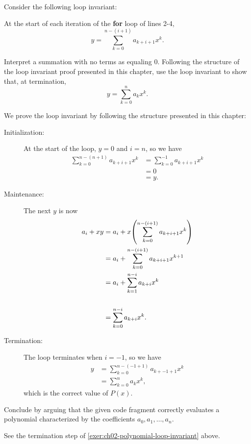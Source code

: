 \documentclass[Chapter02]{subfiles}
\begin{document}
\begin{problems}
\begin{problems}
			\item Consider the following loop invariant: \label{exer:ch02-polynomial-loop-invariant}
			\begin{addmargin}[2em]{2em}
				At the start of each iteration of the \textbf{for} loop of lines 2-4,
				\[
					y = \sum_{k = 0}^{n - (i + 1)} a_{k + i + 1}x^k.
				\]
			\end{addmargin}
			Interpret a summation with no terms as equaling 0. Following the structure of the loop invariant proof presented in this chapter, use the loop invariant to show that, at termination,
			\[
				y = \sum_{k = 0}^n a_kx^k.
			\]
			\begin{answer}
				We prove the loop invariant by following the structure presented in this chapter:
				\begin{description}
					\item[Initialization:] At the start of the loop, $y = 0$ and $i = n$, so we have
					\begin{align*}
						\sum_{k = 0}^{n - (n + 1)} a_{k + i + 1} x^k &= \sum_{k = 0}^{-1} a_{k + i + 1} x^k\\
							&= 0\\
							&= y.
					\end{align*}

					\item[Maintenance:] The next $y$ is now
					\begin{align*}
						a_i + xy &= a_i + x\qty(\sum_{k = 0}^{n - (i + 1)} a_{k + i + 1}x^k)\\
							&= a_i + \sum_{k = 0}^{n - (i + 1)} a_{k + i + 1}x^{k + 1}\\
							&= a_i + \sum_{k = 1}^{n - i} a_{k + i}x^k\\\\
							&= \sum_{k = 0}^{n - i} a_{k + i}x^k.
					\end{align*}

					\item[Termination:] The loop terminates when $i = -1$, so we have
					\begin{align*}
						y &= \sum_{k = 0}^{n - (-1 + 1)} a_{k + -1 + 1}x^k\\
							&= \sum_{k = 0}^{n} a_kx^k,
					\end{align*}
					which is the correct value of $P(x)$.
				\end{description}
			\end{answer}
			
			\item Conclude by arguing that the given code fragment correctly evaluates a polynomial characterized by the coefficients $a_0, a_1, \dots, a_n$.
			\begin{answer}
				See the termination step of \ref{exer:ch02-polynomial-loop-invariant} above.
			\end{answer}
			

\end{problems}
\end{problems}
\end{document}
